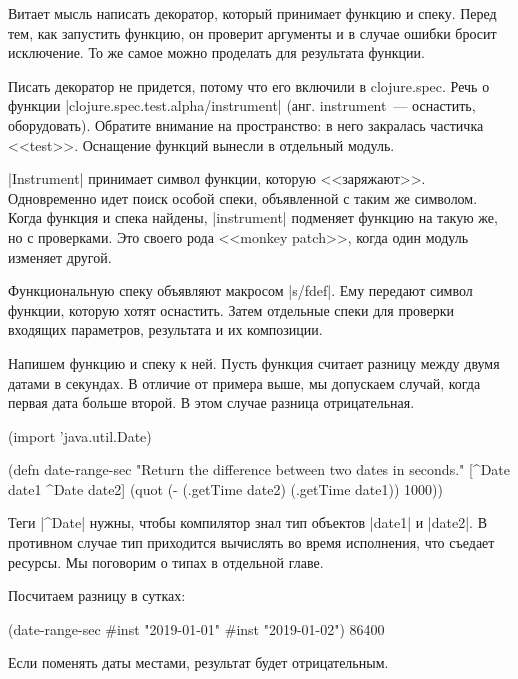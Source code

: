Витает мысль написать декоратор, который принимает функцию и спеку. Перед тем,
как запустить функцию, он проверит аргументы и в случае ошибки бросит
исключение. То же самое можно проделать для результата функции.

Писать декоратор не придется, потому что его включили в clojure.spec. Речь о
функции \spverb|clojure.spec.test.alpha/instrument| (анг. instrument~---
оснастить, оборудовать). Обратите внимание на пространство: в него закралась
частичка <<test>>. Оснащение функций вынесли в отдельный модуль.

\spverb|Instrument| принимает символ функции, которую <<заряжают>>. Одновременно
идет поиск особой спеки, объявленной с таким же символом. Когда функция и спека
найдены, \spverb|instrument| подменяет функцию на такую же, но с проверками. Это своего
рода <<monkey patch>>, когда один модуль изменяет другой.

Функциональную спеку объявляют макросом \spverb|s/fdef|. Ему передают символ
функции, которую хотят оснастить. Затем отдельные спеки для проверки входящих
параметров, результата и их композиции.

Напишем функцию и спеку к ней. Пусть функция считает разницу между двумя датами
в секундах. В отличие от примера выше, мы допускаем случай, когда первая дата
больше второй. В этом случае разница отрицательная.

\begin{english}
  \begin{clojure}
(import 'java.util.Date)

(defn date-range-sec
  "Return the difference between two dates in seconds."
  [^Date date1 ^Date date2]
  (quot (- (.getTime date2)
           (.getTime date1))
        1000))
  \end{clojure}
\end{english}

Теги \spverb|^Date| нужны, чтобы компилятор знал тип объектов \spverb|date1| и
\spverb|date2|. В противном случае тип приходится вычислять во время исполнения,
что съедает ресурсы. Мы поговорим о типах в отдельной главе.

Посчитаем разницу в сутках:

\begin{english}
  \begin{clojure}
(date-range-sec #inst "2019-01-01" #inst "2019-01-02")
86400
  \end{clojure}
\end{english}

\noindent
Если поменять даты местами, результат будет отрицательным.

